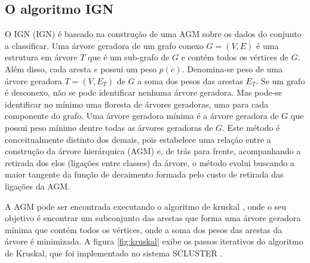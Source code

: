 \begin{figure}[!ht]
	\centering
\end{figure}

\subsection{O algoritmo IGN}
 \label{sub:ign}
O \acrshort{IGN} (\acrlong{IGN}) \cite{ign} é baseado na construção de uma \acrfull{AGM} sobre os dados do conjunto a classificar. Uma árvore geradora de um grafo conexo ${G = (V, E)}$ é uma estrutura em árvore ${T}$ que é um sub-grafo de ${G}$ e contém todos os vértices de ${G}$. Além disso, cada aresta ${e}$ possui um peso ${p(e)}$. Denomina-se peso de uma árvore geradora ${T=(V,E_T)}$ de ${G}$ a soma dos pesos das arestas ${E_T}$. Se um grafo é desconexo, não se pode identificar nenhuma árvore geradora. Mas pode-se identificar no mínimo uma floresta de árvores geradoras, uma para cada componente do grafo. Uma árvore geradora mínima é a árvore geradora de ${G}$ que possui peso mínimo dentre todas as árvores geradoras de ${G}$.
Este método é conceitualmente distinto dos demais, pois estabelece uma relação entre a construção da árvore hierárquica (\acrshort{AGM}) e, de trás para frente, acompanhando a retirada dos elos (ligações entre classes) da árvore, o método evolui buscando a maior tangente da função de decaimento formada pelo custo de retirada das ligações da \acrshort{AGM}.

A \acrshort{AGM} pode ser encontrada executando o algoritmo de kruskal \cite{kruskal}, onde o seu objetivo é encontrar um subconjunto das arestas que forma uma árvore geradora mínima que contém todos os vértices, onde a soma dos pesos das arestas da árvore é minimizada. A figura \ref{fig:kruskal} exibe os passos iterativos do algoritmo de Kruskal, que foi implementado no sistema SCLUSTER \cite{scluster}.


